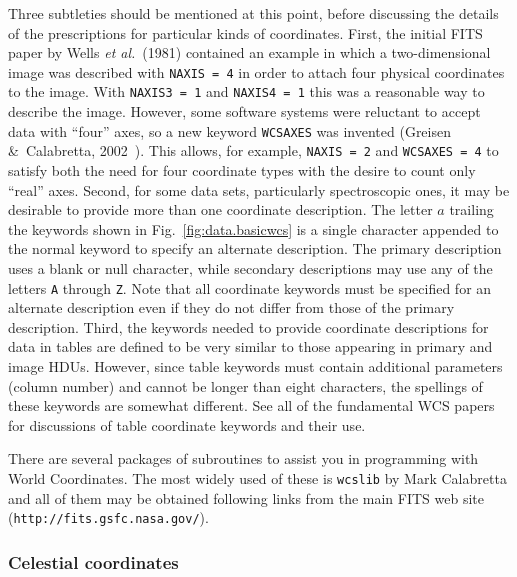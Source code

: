\documentclass[twoside]{article}
\newcommand{\etal}{{\it et al.}}
\newcommand{\keyw}[1]{\hbox{{\tt #1}}}
\begin{document}
Three subtleties should be mentioned at this point, before discussing
the details of the prescriptions for particular kinds of coordinates.
First, the initial FITS paper by Wells \etal~(1981) contained an
example in which a two-dimensional image was described with \keyw{NAXIS
  = 4} in order to attach four physical coordinates to the image.
With \keyw{NAXIS3 = 1} and \keyw{NAXIS4 = 1} this was a reasonable way
to describe the image.  However, some software systems were reluctant
to accept data with ``four'' axes, so a new keyword \keyw{WCSAXES} was
invented (Greisen \&\ Calabretta, 2002~\cite{GC02}).  This
allows, for example, \keyw{NAXIS = 2} and \keyw{WCSAXES = 4} to satisfy
both the need for four coordinate types with the desire to count only
``real'' axes.  Second, for some data sets, particularly spectroscopic
ones, it may be desirable to provide more than one coordinate
description.  The letter $a$ trailing the keywords shown in
Fig.~\ref{fig:data.basicwcs} is a single character appended to the
normal keyword to specify an alternate description.  The primary
description uses a blank or null character, while secondary
descriptions may use any of the letters \keyw{A} through \keyw{Z}.
Note that all coordinate keywords must be specified for an alternate
description even if they do not differ from those of the primary
description.  Third, the keywords needed to provide coordinate
descriptions for data in tables are defined to be very similar to
those appearing in primary and image HDUs.  However, since table
keywords must contain additional parameters (column number) and cannot
be longer than eight characters, the spellings of these keywords are
somewhat different.  See all of the fundamental WCS papers for
discussions of table coordinate keywords and their use.

There are several packages of subroutines to assist you in programming
with World Coordinates.  The most widely used of these is \keyw{wcslib}
by Mark Calabretta and all of them may be obtained following links
from the main FITS web site (\keyw{http://fits.gsfc.nasa.gov/}).

\subsubsection{Celestial coordinates}
\end{document}
